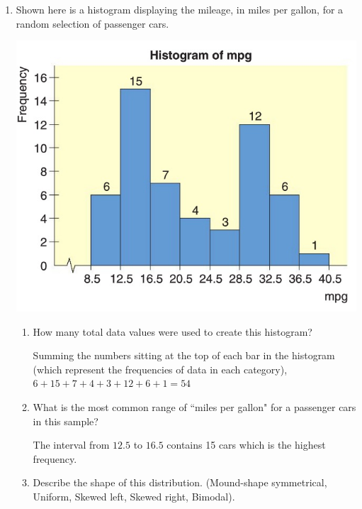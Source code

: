 \documentclass{article}
\newcommand{\answer}[1]{\color{white}#1}
\begin{document}
\pagestyle{myheadings}

\begin{center}
\textbf{}
\end{center}

\begin{enumerate}

\item Shown here is a histogram displaying the mileage, in miles per gallon, for a random selection of passenger cars. 

\includegraphics[scale=0.25]{WS2_MPGall.jpg} 

	\begin{enumerate}
	\item How many total data values were used to create this histogram?
	
	{\answer{Summing the numbers sitting at the top of each bar in the histogram (which represent the frequencies of data in each category), $6+15+7+4+3+12+6+1 = 54$}} 
	
	\item What is the most common range of  ``miles per gallon" for a passenger cars in this sample?

	{\answer{The interval from $12.5$ to $16.5$ contains 15 cars which is the highest frequency.}} 

	\item Describe the shape of this distribution.  (Mound-shape symmetrical, Uniform, Skewed left, Skewed right, Bimodal).
	

\end{enumerate}
\end{enumerate}
\end{document}
